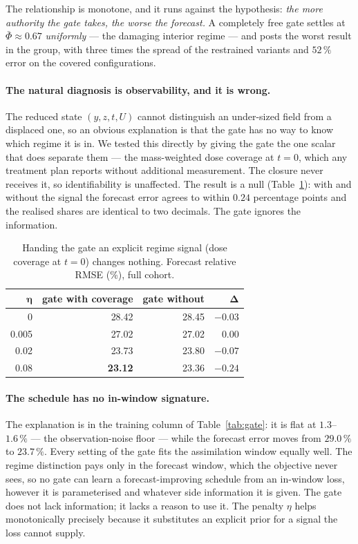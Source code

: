The relationship is monotone, and it runs against the hypothesis: \emph{the more
authority the gate takes, the worse the forecast.} A completely free gate settles
at $\bar\Phi\approx0.67$ \emph{uniformly} --- the damaging interior regime ---
and posts the worst result in the group, with three times the spread of the
restrained variants and $52\,\%$ error on the covered configurations.

\paragraph{The natural diagnosis is observability, and it is wrong.}
The reduced state $(y,z,t,U)$ cannot distinguish an under-sized field from a
displaced one, so an obvious explanation is that the gate has no way to know
which regime it is in. We tested this directly by giving the gate the one scalar
that does separate them --- the mass-weighted dose coverage at $t=0$, which any
treatment plan reports without additional measurement. The closure never
receives it, so identifiability is unaffected. The result is a null
(Table~\ref{tab:context}): with and without the signal the forecast error agrees
to within $0.24$ percentage points and the realised shares are identical to two
decimals. The gate ignores the information.

\begin{table}[H]
\caption{Handing the gate an explicit regime signal (dose coverage at $t=0$)
changes nothing. Forecast relative RMSE (\%), full cohort.}
\label{tab:context}
\centering\scriptsize
\setlength{\tabcolsep}{6pt}
\begin{tabular}{rrrr}
\hline
$\bm{\eta}$ & \textbf{gate with coverage} & \textbf{gate without} & $\bm{\Delta}$ \\
\hline
0 & 28.42 & 28.45 & $-0.03$ \\
0.005 & 27.02 & 27.02 & $0.00$ \\
0.02 & 23.73 & 23.80 & $-0.07$ \\
0.08 & \textbf{23.12} & 23.36 & $-0.24$ \\
\hline
\end{tabular}
\end{table}

\paragraph{The schedule has no in-window signature.}
The explanation is in the training column of Table~\ref{tab:gate}: it is flat at
$1.3$--$1.6\,\%$ --- the observation-noise floor --- while the forecast error
moves from $29.0\,\%$ to $23.7\,\%$. Every setting of the gate fits the
assimilation window equally well. The regime distinction pays only in the
forecast window, which the objective never sees, so no gate can learn a
forecast-improving schedule from an in-window loss, however it is parameterised
and whatever side information it is given. The gate does not lack information;
it lacks a reason to use it. The penalty $\eta$ helps monotonically precisely
because it substitutes an explicit prior for a signal the loss cannot supply.

